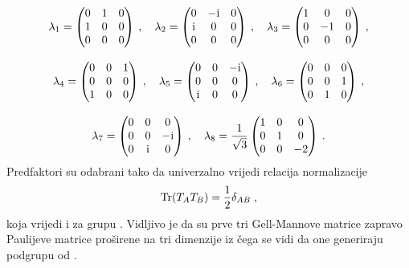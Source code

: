 \begin{gather}
\lambda_1 = \begin{pmatrix} 0 & 1 & 0 \\ 1 & 0 & 0 \\ 0 & 0 & 0 \end{pmatrix}\:,\quad
\lambda_2 = \begin{pmatrix} 0 & -\textrm{i} & 0 \\ \textrm{i} & 0 & 0 \\ 0 & 0 & 0 \end{pmatrix}\:,\quad
\lambda_3 = \begin{pmatrix} 1 & 0 & 0 \\ 0 & -1 & 0 \\ 0 & 0 & 0 \end{pmatrix}\:, \nonumber \\[2ex]
\lambda_4 = \begin{pmatrix} 0 & 0 & 1 \\ 0 & 0 & 0 \\ 1 & 0 & 0 \end{pmatrix}\:,\quad
\lambda_5 = \begin{pmatrix} 0 & 0 & -\textrm{i} \\ 0 & 0 & 0 \\ \textrm{i} & 0 & 0 \end{pmatrix}\:,\quad
\lambda_6 = \begin{pmatrix} 0 & 0 & 0 \\ 0 & 0 & 1 \\ 0 & 1 & 0 \end{pmatrix}\:, \\[2ex]
\lambda_7 = \begin{pmatrix} 0 & 0 & 0 \\ 0 & 0 & -\textrm{i} \\ 0 & \textrm{i} & 0 \end{pmatrix}\:,\quad
\lambda_8 = \frac{1}{\sqrt{3}} \begin{pmatrix} 1 & 0 & 0 \\ 0 & 1 & 0 \\ 0 & 0 & -2 \end{pmatrix}
\:.
\nonumber
\end{gather}
Predfaktori su odabrani tako da univerzalno vrijedi relacija normalizacije
\begin{equation}
 \operatorname{Tr}(T_A T_B) = \frac{1}{2} \delta_{AB} \;,
\label{eq:SU3norm}
\end{equation}
koja vrijedi i za grupu .
Vidljivo je da su prve tri Gell-Mannove matrice zapravo Paulijeve matrice
proširene na tri dimenzije iz čega se vidi da one generiraju  podgrupu od .
